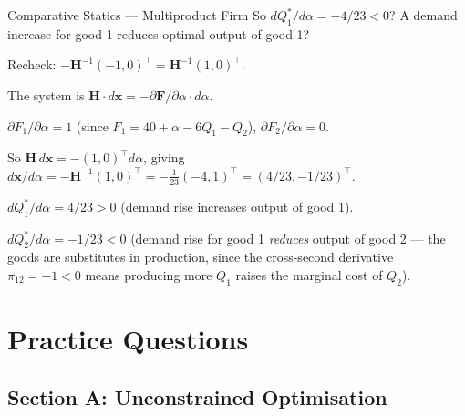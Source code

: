 \documentclass[12pt, a4paper]{article}
\theoremstyle{definition}
\newcommand{\bx}{\mathbf{x}}
\newcommand{\bH}{\mathbf{H}}
\begin{document}
\begin{exbox}{Comparative Statics --- Multiproduct Firm}
So $dQ_1^*/d\alpha = -4/23 < 0$? A demand increase for good 1 reduces
optimal output of good 1?

Recheck: $-\bH^{-1}(-1,0)^\top = \bH^{-1}(1,0)^\top$.

The system is $\bH \cdot d\bx = -\partial\mathbf{F}/\partial\alpha \cdot d\alpha$.

$\partial F_1/\partial\alpha = 1$ (since $F_1=40+\alpha-6Q_1-Q_2$),
$\partial F_2/\partial\alpha = 0$.

So $\bH\,d\bx = -(1,0)^\top d\alpha$, giving
$d\bx/d\alpha = -\bH^{-1}(1,0)^\top = -\frac{1}{23}(-4,1)^\top
= (4/23, -1/23)^\top$.

$dQ_1^*/d\alpha = 4/23 > 0$ \checkmark (demand rise increases output of good 1).

$dQ_2^*/d\alpha = -1/23 < 0$ (demand rise for good 1 \emph{reduces} output of
good 2 --- the goods are substitutes in production, since the cross-second
derivative $\pi_{12}=-1<0$ means producing more $Q_1$ raises the marginal
cost of $Q_2$).
\end{exbox}
\newpage
\section{Practice Questions}

\subsection{Section A: Unconstrained Optimisation}
\end{document}
